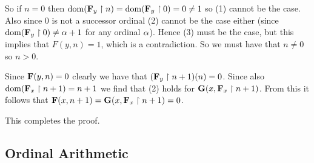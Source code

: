 \begin{solution}
    So if $n=0$ then $\mathrm{dom}(\mathbf{F}_y \restriction n) = \mathrm{dom}(\mathbf{F}_y \restriction 0) = 0 \neq 1$ so (1) cannot be the case.
    Also since $0$ is not a successor ordinal (2) cannot be the case either (since $\mathrm{dom}(\mathbf{F}_y \restriction 0) \neq \alpha+1$ for any ordinal $\alpha$).
    Hence (3) must be the case, but this implies that $F(y,n) = 1$, which is a contradiction.
    So we must have that $n \neq 0$ so $n > 0$.

    Since $\mathbf{F}(y, n) = 0$ clearly we have that $(\mathbf{F}_y \restriction n+1)(n) = 0$.
    Since also $\mathrm{dom}(\mathbf{F}_x \restriction n+1) = n+1$ we find that (2) holds for $\mathbf{G}(x, \mathbf{F}_x \restriction n+1)$.
    From this it follows that $\mathbf{F}(x,n+1) = \mathbf{G}(x, \mathbf{F}_x \restriction n+1) = 0$.

    This completes the proof. \qedsymbol
\end{solution}

\subsection{Ordinal Arithmetic}

